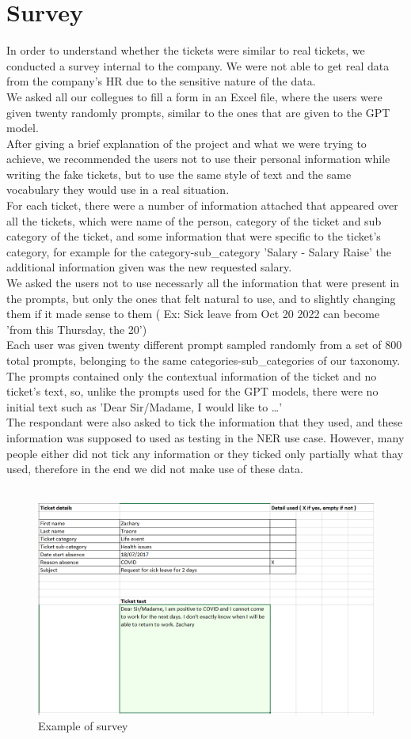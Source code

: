 \section{Survey}
In order to understand whether the tickets were similar to real tickets, we conducted a survey internal to the company. We were not able to get real data from the company's HR due to the sensitive nature of the data. \\
We asked all our collegues to fill a form in an Excel file, where the users were given twenty randomly prompts, similar to the ones that are given to the GPT model. \\
After giving a brief explanation of the project and what we were trying to achieve, we recommended the users not to use their personal information while writing the fake tickets, but to use the same style of text and the same vocabulary they would use in a real situation. \\
For each ticket, there were a number of information attached that appeared over all the tickets, which were name of the person, category of the ticket and sub category of the ticket, and some information that were specific to the ticket's category, for example for the category-sub\_category 'Salary - Salary Raise' the additional information given was the new requested salary. \\
We asked the users not to use necessarly all the information that were present in the prompts, but only the ones that felt natural to use, and to slightly changing them if it made sense to them ( Ex: Sick leave from Oct 20 2022 can become 'from this Thursday, the 20') \\
Each user was given twenty different prompt sampled randomly from a set of 800 total prompts, belonging to the same categories-sub\_categories of our taxonomy. The prompts contained only the contextual information of the ticket and no ticket's text, so, unlike the prompts used for the GPT models, there were no initial text such as 'Dear Sir/Madame, I would like to \dots' \\
The respondant were also asked to tick the information that they used, and these information was supposed to used as testing in the NER use case. However, many people either did not tick any information or they ticked only partially what thay used, therefore in the end we did not make use of these data. \\\\

\begin{figure}[!h] 
    \includegraphics[width=\textwidth]{images/excel_schema_v2.PNG}
    \caption{Example of survey}
    \label{fig:survey}
\end{figure}    


